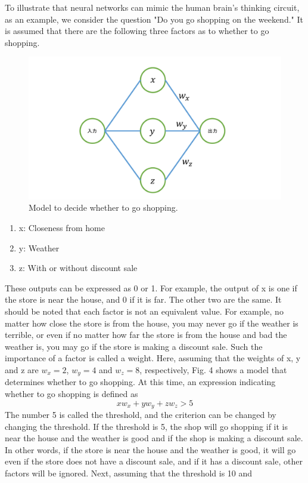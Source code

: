  To illustrate that neural networks can mimic the human brain's thinking circuit, as an example, we consider the question "Do you go shopping on the weekend." It is assumed that there are the following three factors as to whether to go shopping.
\begin{figure}[t]
\begin{center}
\includegraphics[width=0.8\linewidth]{fig/shopmodel.pdf}
\end{center}
\caption{Model to decide whether to go shopping.}
\vspace*{-3pt}
\end{figure}
\begin{enumerate}
\item x: Closeness from home
\item y: Weather
\item z: With or without discount sale
\end{enumerate}
These outputs can be expressed as 0 or 1. For example, the output of x is one if the store is near the house, and 0 if it is far. The other two are the same. It should be noted that each factor is not an equivalent value. For example, no matter how close the store is from the house, you may never go if the weather is terrible, or even if no matter how far the store is from the house and bad the weather is, you may go if the store is making a discount sale. Such the importance of a factor is called a weight. Here, assuming that the weights of x, y and z are $w_x = 2$, $w_y = 4$ and $w_z = 8$, respectively, Fig. 4 shows a model that determines whether to go shopping. At this time, an expression indicating whether to go shopping is defined as 
\begin{equation}
xw_x+yw_y+zw_z > 5
\end{equation}
The number 5 is called the threshold, and the criterion can be changed by changing the threshold. If the threshold is 5, the shop will go shopping if it is near the house and the weather is good and if the shop is making a discount sale. In other words, if the store is near the house and the weather is good, it will go even if the store does not have a discount sale, and if it has a discount sale, other factors will be ignored. Next, assuming that the threshold is 10 and 
